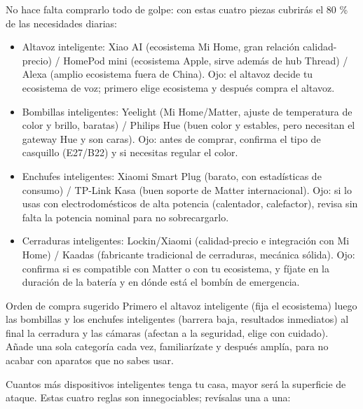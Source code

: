 No hace falta comprarlo todo de golpe: con estas cuatro piezas cubrirás el 80 \% de las necesidades diarias:

\begin{itemize}
  \item Altavoz inteligente: Xiao AI (ecosistema Mi Home, gran relación calidad-precio) / HomePod mini (ecosistema Apple, sirve además de hub Thread) / Alexa (amplio ecosistema fuera de China). Ojo: el altavoz decide tu ecosistema de voz; primero elige ecosistema y después compra el altavoz.
  \item Bombillas inteligentes: Yeelight (Mi Home/Matter, ajuste de temperatura de color y brillo, baratas) / Philips Hue (buen color y estables, pero necesitan el gateway Hue y son caras). Ojo: antes de comprar, confirma el tipo de casquillo (E27/B22) y si necesitas regular el color.
  \item Enchufes inteligentes: Xiaomi Smart Plug (barato, con estadísticas de consumo) / TP-Link Kasa (buen soporte de Matter internacional). Ojo: si lo usas con electrodomésticos de alta potencia (calentador, calefactor), revisa sin falta la potencia nominal para no sobrecargarlo.
  \item Cerraduras inteligentes: Lockin/Xiaomi (calidad-precio e integración con Mi Home) / Kaadas (fabricante tradicional de cerraduras, mecánica sólida). Ojo: confirma si es compatible con Matter o con tu ecosistema, y fíjate en la duración de la batería y en dónde está el bombín de emergencia.
\end{itemize}

\begin{tcbinfo}{Orden de compra sugerido}
Primero el altavoz inteligente (fija el ecosistema) luego las bombillas y los enchufes inteligentes (barrera baja, resultados inmediatos) al final la cerradura y las cámaras (afectan a la seguridad, elige con cuidado). Añade una sola categoría cada vez, familiarízate y después amplía, para no acabar con aparatos que no sabes usar.

\end{tcbinfo}


Cuantos más dispositivos inteligentes tenga tu casa, mayor será la superficie de ataque. Estas cuatro reglas son innegociables; revísalas una a una:

